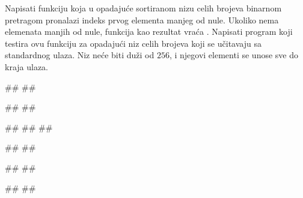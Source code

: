 \begin{Exercise}[label=408]
Napisati funkciju koja u opadajuće sortiranom nizu celih brojeva
binarnom pretragom pronalazi indeks prvog elementa manjeg od
nule. Ukoliko nema elemenata manjih od nule, funkcija kao rezultat
vraća . Napisati program koji testira ovu funkciju za
opadajući niz celih brojeva koji se učitavaju sa standardnog ulaza. Niz
neće biti duži od $256$, i njegovi elementi se unose sve do kraja
ulaza.

\begin{minitest}
\begin{test}{1}
#\naslovUlaz#
##

#\naslovIzlaz#
##
\end{test}
\end{minitest}
\begin{minitest}
\begin{test}{2}
#\naslovUlaz#
##
##

#\naslovIzlaz#
##
\end{test}
\end{minitest}
\begin{minitest}
\begin{test}{3}
#\naslovUlaz#
##

#\naslovIzlaz#
##
\end{test}
\end{minitest}


\end{Exercise}

